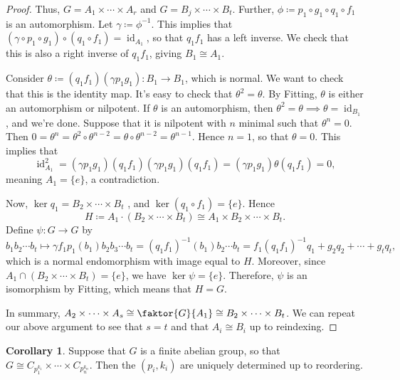 \documentclass[10pt,letterpaper,cm]{nupset}
\theoremstyle{definition}
\theoremstyle{theorem}
\newtheorem{corollary}[definition]{Corollary}
\theoremstyle{remark}
\newcommand{\1}{\mathbf{1}}
\newcommand{\0}{\vec 0}
\DeclareMathOperator{\id}{\mathrm{id}}
\begin{document}
\begin{proof}
\medskip

 Thus, $G= A_1 \times \cdots \times A_r$ and $G= B_j \times \cdots \times B_t$. Further, $\phi\coloneqq p_1\circ g_1\circ q_1\circ f_1$ is an automorphism. Let $\gamma\coloneqq  \phi^{-1}$. This implies that $(\gamma \circ p_1 \circ g_1)\circ (q_1\circ f_1)=\id_{A_1}$, so that $q_1f_1$ has a left inverse. We check that this is also a right inverse of $q_1f_1$, giving $B_1 \cong A_1$.

\medskip

Consider $\theta \coloneqq  (q_1f_1)(\gamma p_1g_1) : B_1 \to B_1$, which is normal. We want to check that this is the identity map. It's easy to check that $ \theta^2 =  \theta.$
By Fitting, $\theta$ is either an automorphism or nilpotent. If $\theta$ is an automorphism, then $\theta^2 = \theta \implies \theta = \id_{B_1}$, and we're done. Suppose that it is nilpotent with $n$ minimal such that $\theta^n =0$. Then $0 = \theta^n = \theta^2 \circ \theta^{n-2} = \theta \circ \theta^{n-2}= \theta^{n-1}$. Hence $n=1$, so that $\theta =0$. This implies that $$\id_{A_1}^2 = (\gamma p_1 g_1)(q_1 f_1)(\gamma p_1 g_1)(q_1 f_1) = (\gamma p_1 g_1)\theta(q_1 f_1) = 0,$$ meaning $A_1= \{e\}$, a contradiction.

\medskip


Now, $\ker{q_1} = B_2 \times \cdots \times B_t$ , and $\ker(q_1 \circ f_1) = \{e\}$. Hence $$H\coloneqq  A_1 \cdot (B_2 \times \cdots \times B_t) \cong A_1 \times B_2 \times \cdots \times B_t.$$ Define $\psi : G\to G$ by $$b_1b_2\cdots b_t \mapsto \gamma f_1p_1(b_1)b_2b_3\cdots b_t = (q_1f_1)^{-1}(b_1)b_2\cdots b_t= f_1(q_1f_1)^{-1}q_1 + g_2q_2+\cdots + g_tq_t ,$$ which is a normal endomorphism with image equal to $H$. Moreover, since $A_1\cap (B_2 \times \cdots \times B_t) =\{e\}$, we have $\ker{\psi} =\{e\}$. Therefore, $\psi$ is an isomorphism by Fitting, which means that $H=G$.

\medskip

 In summary, $A_2 \times \cdots \times A_s \cong \faktor{G}{A_1} \cong B_2\times \cdots \times B_t$. We can repeat our above argument to see that $s=t$ and that $A_i \cong B_i$ up to reindexing.
\end{proof}

\begin{corollary}
Suppose that $G$ is a finite abelian group, so that $G \cong C_{p_1^{k_1}} \times \cdots \times C_{p_n^{k_n}}$. Then the $(p_i, k_i)$ are uniquely determined up to reordering.
\end{corollary}
\end{document}

